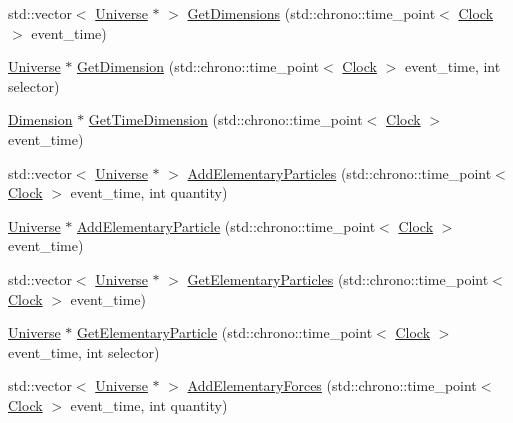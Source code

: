 \begin{DoxyCompactItemize}
std\+::vector$<$ \mbox{\hyperlink{classUniverse}{Universe}} $\ast$ $>$ \mbox{\hyperlink{classUniverse_a1869fc7bf43827378bab5a701f7f917a}{Get\+Dimensions}} (std\+::chrono\+::time\+\_\+point$<$ \mbox{\hyperlink{universe_8h_a0ef8d951d1ca5ab3cfaf7ab4c7a6fd80}{Clock}} $>$ event\+\_\+time)
\item 
\mbox{\hyperlink{classUniverse}{Universe}} $\ast$ \mbox{\hyperlink{classUniverse_ab79a380dee684c6dc304b571f4d28645}{Get\+Dimension}} (std\+::chrono\+::time\+\_\+point$<$ \mbox{\hyperlink{universe_8h_a0ef8d951d1ca5ab3cfaf7ab4c7a6fd80}{Clock}} $>$ event\+\_\+time, int selector)
\item 
\mbox{\hyperlink{classDimension}{Dimension}} $\ast$ \mbox{\hyperlink{classUniverse_a79b95c06aadea69cec3b51046cd9e0f8}{Get\+Time\+Dimension}} (std\+::chrono\+::time\+\_\+point$<$ \mbox{\hyperlink{universe_8h_a0ef8d951d1ca5ab3cfaf7ab4c7a6fd80}{Clock}} $>$ event\+\_\+time)
\item 
std\+::vector$<$ \mbox{\hyperlink{classUniverse}{Universe}} $\ast$ $>$ \mbox{\hyperlink{classUniverse_a857cf7f208cd11c80736e82fa523feb5}{Add\+Elementary\+Particles}} (std\+::chrono\+::time\+\_\+point$<$ \mbox{\hyperlink{universe_8h_a0ef8d951d1ca5ab3cfaf7ab4c7a6fd80}{Clock}} $>$ event\+\_\+time, int quantity)
\item 
\mbox{\hyperlink{classUniverse}{Universe}} $\ast$ \mbox{\hyperlink{classUniverse_ab9c84e0576de50aa4fa46655832ce5e4}{Add\+Elementary\+Particle}} (std\+::chrono\+::time\+\_\+point$<$ \mbox{\hyperlink{universe_8h_a0ef8d951d1ca5ab3cfaf7ab4c7a6fd80}{Clock}} $>$ event\+\_\+time)
\item 
std\+::vector$<$ \mbox{\hyperlink{classUniverse}{Universe}} $\ast$ $>$ \mbox{\hyperlink{classUniverse_a168fd9bf7602adcba1de5dd93a212775}{Get\+Elementary\+Particles}} (std\+::chrono\+::time\+\_\+point$<$ \mbox{\hyperlink{universe_8h_a0ef8d951d1ca5ab3cfaf7ab4c7a6fd80}{Clock}} $>$ event\+\_\+time)
\item 
\mbox{\hyperlink{classUniverse}{Universe}} $\ast$ \mbox{\hyperlink{classUniverse_acef54e17666d17078c522388f8f6e4f9}{Get\+Elementary\+Particle}} (std\+::chrono\+::time\+\_\+point$<$ \mbox{\hyperlink{universe_8h_a0ef8d951d1ca5ab3cfaf7ab4c7a6fd80}{Clock}} $>$ event\+\_\+time, int selector)
\item 
std\+::vector$<$ \mbox{\hyperlink{classUniverse}{Universe}} $\ast$ $>$ \mbox{\hyperlink{classUniverse_a81d294300346e9f901836ab609cce942}{Add\+Elementary\+Forces}} (std\+::chrono\+::time\+\_\+point$<$ \mbox{\hyperlink{universe_8h_a0ef8d951d1ca5ab3cfaf7ab4c7a6fd80}{Clock}} $>$ event\+\_\+time, int quantity)

\end{DoxyCompactItemize}
